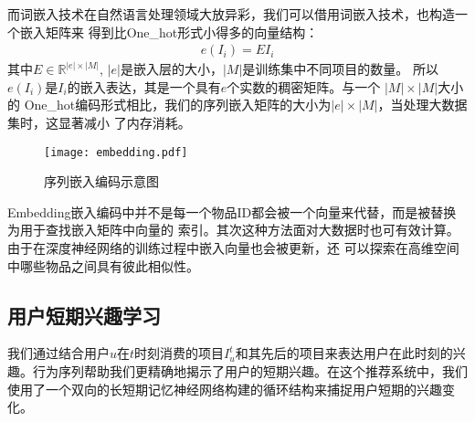 而词嵌入技术在自然语言处理领域大放异彩，我们可以借用词嵌入技术，也构造一个嵌入矩阵来%
得到比One\_hot形式小得多的向量结构：
\begin{align}
e(I_i) = EI_i
\end{align}
其中$E\in \mathbb{R}^{|e|\times |M|}$, $|e|$是嵌入层的大小，$|M|$是训练集中不同项目的数量。%
所以$e(I_i)$是$I_i$的嵌入表达，其是一个具有$e$个实数的稠密矩阵。与一个 $|M|\times |M|$大小的%
One\_hot编码形式相比，我们的序列嵌入矩阵的大小为$|e|\times |M|$，当处理大数据集时，这显著减小%
了内存消耗。
\begin{figure}[htb]
  \centering
  \texttt{[image: embedding.pdf]}\\
  \caption{序列嵌入编码示意图}
  \label{fig:embedding}
\end{figure}
Embedding嵌入编码中并不是每一个物品ID都会被一个向量来代替，而是被替换为用于查找嵌入矩阵中向量的%
索引。其次这种方法面对大数据时也可有效计算。由于在深度神经网络的训练过程中嵌入向量也会被更新，还%
可以探索在高维空间中哪些物品之间具有彼此相似性。

\subsection{用户短期兴趣学习}

我们通过结合用户$u$在$t$时刻消费的项目$I_{u}^{t}$和其先后的项目来表达用户在此时刻的兴趣。行为序列帮助我们更精确地揭示了用户的短期兴趣。在这个推荐系统中，我们使用了一个双向的长短期记忆神经网络构建的循环结构来捕捉用户短期的兴趣变化。


